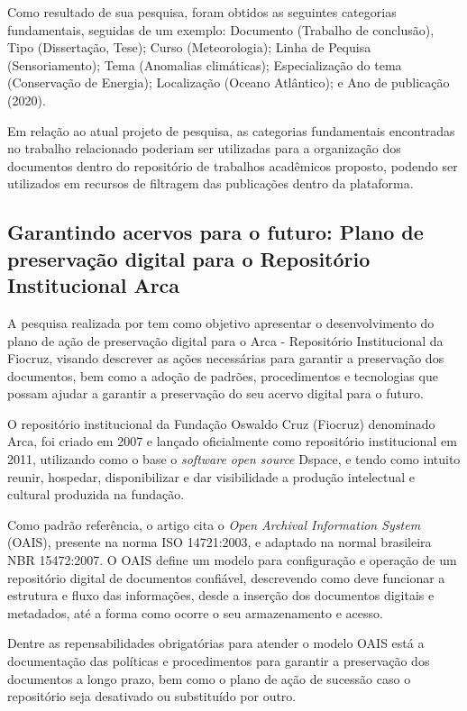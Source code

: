 Como resultado de sua pesquisa, foram obtidos as seguintes categorias
fundamentais, seguidas de um exemplo: Documento (Trabalho de conclusão), Tipo (Dissertação, Tese);
Curso (Meteorologia); Linha de Pequisa (Sensoriamento);
Tema (Anomalias climáticas); Especialização do tema (Conservação de Energia);
Localização (Oceano Atlântico); e Ano de publicação (2020).

Em relação ao atual projeto de pesquisa, as categorias fundamentais encontradas
no trabalho relacionado poderiam ser utilizadas para a organização dos documentos dentro do repositório
de trabalhos acadêmicos proposto, podendo ser utilizados em recursos de
filtragem das publicações dentro da plataforma.

\subsection{Garantindo acervos para o futuro: Plano de preservação digital para o Repositório Institucional Arca}

A pesquisa realizada por \cite{2020:Queiroz} tem como objetivo
apresentar o desenvolvimento do plano de ação de preservação digital
para o Arca - Repositório Institucional da Fiocruz, visando descrever
as ações necessárias para garantir a preservação dos documentos, bem como
a adoção de padrões, procedimentos e tecnologias que possam ajudar a garantir
a preservação do seu acervo digital para o futuro.

O repositório institucional da Fundação Oswaldo Cruz (Fiocruz) denominado
Arca, foi criado em 2007 e lançado oficialmente como repositório institucional em 2011,
utilizando como o base o \emph{software open source} Dspace, e tendo como intuito
reunir, hospedar, disponibilizar e dar visibilidade a produção intelectual e cultural
produzida na fundação.

Como padrão referência, o artigo cita o \emph{Open Archival Information System}
(OAIS), presente na norma ISO 14721:2003, e adaptado na normal brasileira
NBR 15472:2007. O OAIS define um modelo para configuração e operação
de um repositório digital de documentos confiável, descrevendo como deve funcionar
a estrutura e fluxo das informações, desde a inserção dos documentos digitais e
metadados, até a forma como ocorre o seu armazenamento e acesso.

Dentre as repensabilidades obrigatórias para atender o modelo OAIS
está a documentação das políticas e procedimentos para garantir
a preservação dos documentos a longo prazo, bem como o plano de ação
de sucessão caso o repositório seja desativado ou substituído por outro.

